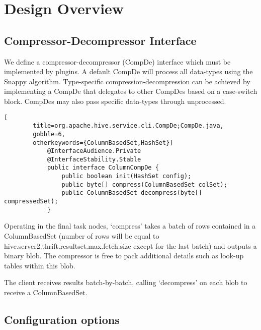 \documentclass[11pt,a4paper]{article}
\begin{document}
\section{Design Overview}

	\subsection{Compressor-Decompressor Interface}
		
		We define a compressor-decompressor (CompDe) interface which must be implemented by plugins.
		A default CompDe will process all data-types using the Snappy algorithm.
		Type-specific compression-decompression can be achieved by implementing a CompDe that delegates to other CompDes based on a case-switch block.
		CompDes may also pass specific data-types through unprocessed.
		
		\begin{lstlisting}[
		title=org.apache.hive.service.cli.CompDe;CompDe.java,
		gobble=6,
		otherkeywords={ColumnBasedSet,HashSet}]
			@InterfaceAudience.Private
			@InterfaceStability.Stable
			public interface ColumnCompDe {
				public boolean init(HashSet config);
				public byte[] compress(ColumnBasedSet colSet);
				public ColumnBasedSet decompress(byte[] compressedSet);
			}
		\end{lstlisting}
		
		Operating in the final task nodes, `compress' takes a batch of rows contained in a ColumnBasedSet (number of rows will be equal to \linebreak hive.server2.thrift.resultset.max.fetch.size except for the last batch) and outputs a binary blob.
		The compressor is free to pack additional details such as look-up tables within this blob.
		
		The client receives results batch-by-batch, calling `decompress' on each blob to receive a ColumnBasedSet.
		
	\subsection{Configuration options}
		
\end{document}
